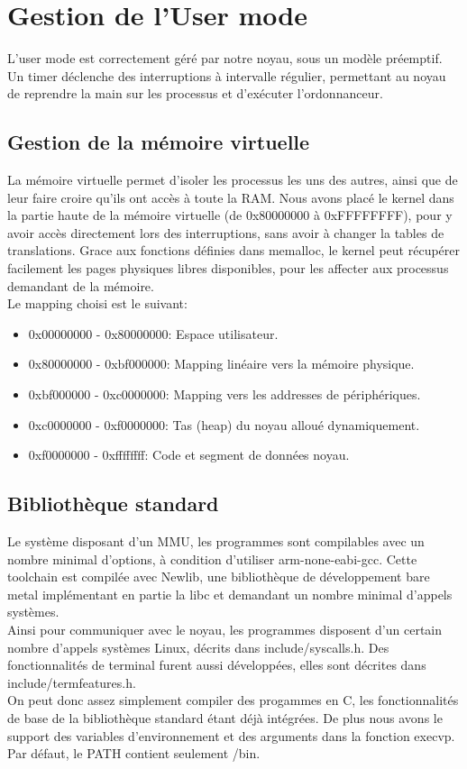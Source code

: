 \documentclass[a4paper]{article}
\begin{document}
\section{Gestion de l'User mode}
L'user mode est correctement géré par notre noyau, sous un modèle préemptif.
Un timer déclenche des interruptions à intervalle régulier, permettant au noyau
de reprendre la main sur les processus et d'exécuter l'ordonnanceur.

\subsection{Gestion de la mémoire virtuelle}
La mémoire virtuelle permet d'isoler les processus les uns des autres, ainsi que
de leur faire croire qu'ils ont accès à toute la RAM. Nous avons placé le kernel
dans la partie haute de la mémoire virtuelle (de 0x80000000 à 0xFFFFFFFF), pour
y avoir accès directement lors des interruptions, sans avoir à changer la tables
de translations. Grace aux fonctions définies dans memalloc, le kernel peut
récupérer facilement les pages physiques libres disponibles, pour les affecter
aux processus demandant de la mémoire. \\
Le mapping choisi est le suivant:
\begin{itemize}
	\item 0x00000000 - 0x80000000: Espace utilisateur.
	\item 0x80000000 - 0xbf000000: Mapping linéaire vers la mémoire physique.
	\item 0xbf000000 - 0xc0000000: Mapping vers les addresses de périphériques.
	\item 0xc0000000 - 0xf0000000: Tas (heap) du noyau alloué dynamiquement.
	\item 0xf0000000 - 0xffffffff: Code et segment de données noyau.
\end{itemize}
\subsection{Bibliothèque standard}
Le système disposant d'un MMU, les programmes sont compilables avec un nombre
minimal d'options, à condition d'utiliser arm-none-eabi-gcc. Cette toolchain
est compilée avec Newlib, une bibliothèque de développement bare metal
implémentant en partie la libc et demandant un nombre minimal d'appels systèmes. \\
Ainsi pour communiquer avec le noyau, les programmes disposent d'un certain
nombre d'appels systèmes Linux, décrits dans include/syscalls.h.
Des fonctionnalités de terminal furent aussi développées, elles sont décrites
dans include/termfeatures.h. \\
On peut donc assez simplement compiler des progammes en C, les fonctionnalités
de base de la bibliothèque standard étant déjà intégrées. De plus nous avons le
support des variables d'environnement et des arguments dans la fonction execvp.
Par défaut, le PATH contient seulement /bin.
\end{document}

